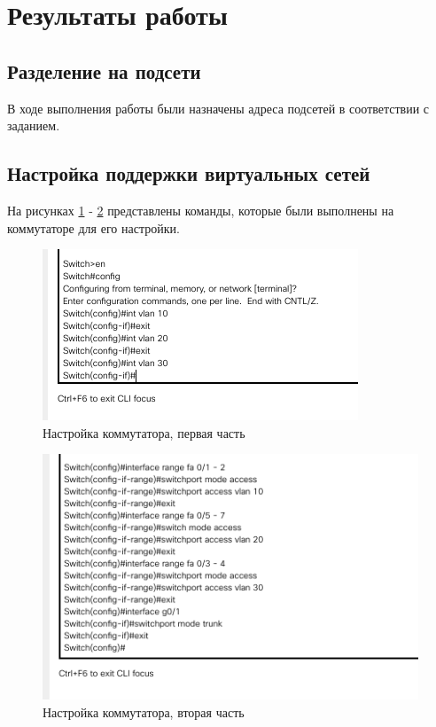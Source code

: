 \documentclass[12pt]{report}
\begin{document}
\section*{Результаты работы}

\subsection*{Разделение на подсети}

В ходе выполнения работы были назначены адреса подсетей в соответствии с заданием.

\subsection*{Настройка поддержки виртуальных сетей}

На рисунках \ref{fig:1} - \ref{fig:2} представлены команды, которые были выполнены на коммутаторе для его настройки.

\begin{figure}[H]
	\begin{center}
		\includegraphics[scale=0.7]{img/1.png}
	\end{center}
	\caption{Настройка коммутатора, первая часть}
	\label{fig:1}
\end{figure}

\begin{figure}[H]
	\begin{center}
		\includegraphics[scale=0.7]{img/2.png}
	\end{center}
	\caption{Настройка коммутатора, вторая часть}
	\label{fig:2}
\end{figure}
\end{document}
